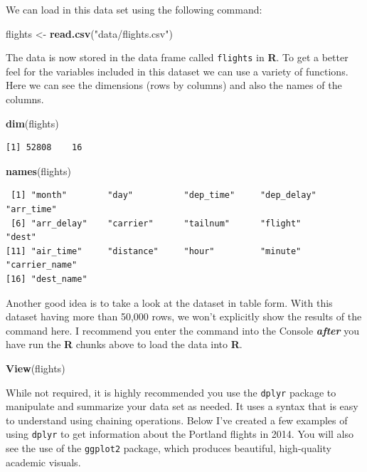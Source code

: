 \documentclass[12pt,twoside]{reedthesis}
\newenvironment{Shaded}{\begin{snugshade}}{\end{snugshade}}
\newcommand{\FunctionTok}[1]{\textcolor[rgb]{0.13,0.29,0.53}{\textbf{#1}}}
\newcommand{\NormalTok}[1]{#1}
\newcommand{\OtherTok}[1]{\textcolor[rgb]{0.56,0.35,0.01}{#1}}
\newcommand{\StringTok}[1]{\textcolor[rgb]{0.31,0.60,0.02}{#1}}
\begin{document}
We can load in this data set using the following command:
\begin{Shaded}
\begin{Highlighting}[]
\NormalTok{flights }\OtherTok{\textless{}{-}} \FunctionTok{read.csv}\NormalTok{(}\StringTok{"data/flights.csv"}\NormalTok{)}
\end{Highlighting}
\end{Shaded}
The data is now stored in the data frame called \texttt{flights} in \textbf{R}. To get a better feel for the variables included in this dataset we can use a variety of functions. Here we can see the dimensions (rows by columns) and also the names of the columns.
\begin{Shaded}
\begin{Highlighting}[]
\FunctionTok{dim}\NormalTok{(flights)}
\end{Highlighting}
\end{Shaded}
\begin{verbatim}
[1] 52808    16
\end{verbatim}
\begin{Shaded}
\begin{Highlighting}[]
\FunctionTok{names}\NormalTok{(flights)}
\end{Highlighting}
\end{Shaded}
\begin{verbatim}
 [1] "month"        "day"          "dep_time"     "dep_delay"    "arr_time"    
 [6] "arr_delay"    "carrier"      "tailnum"      "flight"       "dest"        
[11] "air_time"     "distance"     "hour"         "minute"       "carrier_name"
[16] "dest_name"   
\end{verbatim}
Another good idea is to take a look at the dataset in table form. With this dataset having more than 50,000 rows, we won't explicitly show the results of the command here. I recommend you enter the command into the Console \textbf{\emph{after}} you have run the \textbf{R} chunks above to load the data into \textbf{R}.
\begin{Shaded}
\begin{Highlighting}[]
\FunctionTok{View}\NormalTok{(flights)}
\end{Highlighting}
\end{Shaded}
While not required, it is highly recommended you use the \texttt{dplyr} package to manipulate and summarize your data set as needed. It uses a syntax that is easy to understand using chaining operations. Below I've created a few examples of using \texttt{dplyr} to get information about the Portland flights in 2014. You will also see the use of the \texttt{ggplot2} package, which produces beautiful, high-quality academic visuals.
\end{document}
